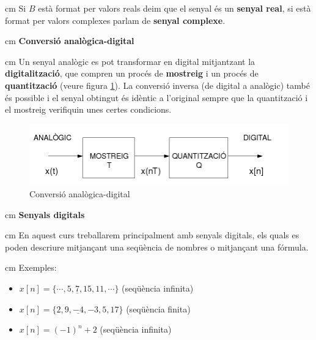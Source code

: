 \documentclass{article}
\begin{document}
 cm
\noindent
Si $B$ est\`a format per valors reals deim que el senyal \'es un \textbf{senyal real},
si est\`a format per valors complexes parlam de \textbf{senyal complexe}.


 cm
\noindent
\textbf{Conversi\'o anal\`ogica-digital}

 cm
\noindent
Un senyal anal\`ogic es pot transformar en digital mitjantzant la
\textbf{digitalitzaci\'o}, que compren un proc\'es de \textbf{mostreig}
i un proc\'es de \textbf{quantitzaci\'o} (veure figura \ref{conversioAD}). 
La conversi\'o inversa (de
digital a anal\`ogic) tamb\'e \'es possible i el senyal obtingut \'es
id\`entic a l'original sempre que la quantitzaci\'o i el mostreig 
verifiquin unes certes condicions.

\begin{figure}[htbp]
\centering
\includegraphics[width=14cm]{conversioAD.png} 
\caption{Conversi\'o anal\`ogica-digital}
\label{conversioAD}
\end{figure}

 cm
\noindent
\textbf{\large Senyals digitals}

 cm
\noindent
En aquest curs treballarem principalment amb senyals digitals, els quals es poden 
descriure mitjan\c{c}ant una seq\"u\`encia de nombres o mitjan\c{c}ant una f\'ormula.

 cm
\noindent
Exemples:
\begin{itemize}
\item $x[n]=\{ \cdots, 5, \underline{7}, 15, 11, \cdots \}$ (seq\"u\`encia infinita)
\item $x[n]=\{2, 9, \underline{-4}, -3, 5, 17 \}$  (seq\"u\`encia finita)
\item $x[n]=(-1)^n + 2$  (seq\"u\`encia infinita)
\end{itemize}
\end{document}
